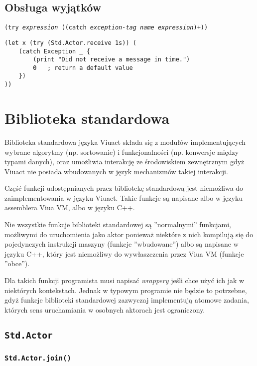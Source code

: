 \documentclass[11pt,oneside,a4paper,titlepage,onecolumn]{article}
\begin{document}
\subsection{Obsługa wyjątków}

\texttt{(try \emph{expression} ((catch \emph{exception-tag} \emph{name} \emph{expression})+))}

\begin{lstlisting}
(let x (try (Std.Actor.receive 1s)) (
    (catch Exception _ {
        (print "Did not receive a message in time.")
        0   ; return a default value
    })
))
\end{lstlisting}

\newpage
\section{Biblioteka standardowa}

Biblioteka standardowa języka Viuact składa się z modułów implementujących wybrane algorytmy (np. sortowanie)
i funkcjonalności (np. konwersje między typami danych), oraz umożliwia interakcję ze środowiskiem zewnętrznym
gdyż Viuact nie posiada wbudowanych w język mechanizmów takiej interakcji.

Część funkcji udostępnianych przez bibliotekę standardową jest niemożliwa do zaimplementowania w języku
Viuact. Takie funkcje są napisane albo w języku assemblera Viua VM, albo w języku C++.

Nie wszystkie funkcje biblioteki standardowej są ''normalnymi'' funkcjami, możliwymi do uruchomienia jako
aktor ponieważ niektóre z nich kompilują się do pojedynczych instrukcji maszyny (funkcje ''wbudowane'') albo
są napisane w języku C++, który jest niemożliwy do wywłaszczenia przez Viua VM (funkcje ''obce'').

Dla takich funkcji programista musi napisać \emph{wrappery} jeśli chce użyć ich jak w niektórych kontekstach.
Jednak w typowym programie nie będzie to potrzebne, gdyż funkcje biblioteki standardowej zazwyczaj
implementują atomowe zadania, których sens uruchamiania w osobnych aktorach jest ograniczony.

\subsection{\texttt{Std.Actor}}

\subsubsection{\texttt{Std.Actor.join()}}
\label{Std_Actor_join}
\end{document}
